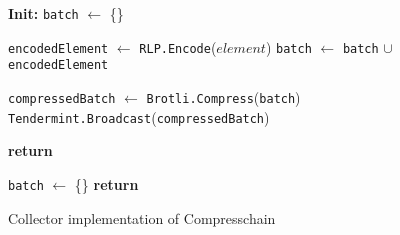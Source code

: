 \begin{figure}[t!]
  \begin{adjustbox}{minipage=[t]{\columnwidth}}
    \begin{algorithm}[H]
      \renewcommand{\thealgorithm}{Compress Collector}         
      \caption{\small Collector implementation of Compresschain}%
      \label{alg:collector-brotli}%
      \small
      \begin{algorithmic}[1]
            \State \textbf{Init:} \texttt{batch} $\leftarrow$ \{\}
      
            \label{alg:brotli_add_tx}
            			\State \texttt{encodedElement} $\leftarrow$ \texttt{RLP.Encode}($element$)
					\State \texttt{batch} $\leftarrow$ \texttt{batch} $\cup$ \texttt{encodedElement}
            
             			\State \texttt{compressedBatch} $\leftarrow$  \texttt{Brotli.Compress}(\texttt{batch})
                			\State \texttt{Tendermint.Broadcast}(\texttt{compressedBatch})
                			\State {}
             	   \EndIf
             	\EndIf
                	
                \State \textbf{return}
            \EndFunction
            
            \label{alg:brotli_reset}
            		\State \texttt{batch} $\leftarrow$ \{\}
                \State \textbf{return}
            \EndFunction
        \end{algorithmic}
      \end{algorithm}
	\end{adjustbox}
  \end{figure}

